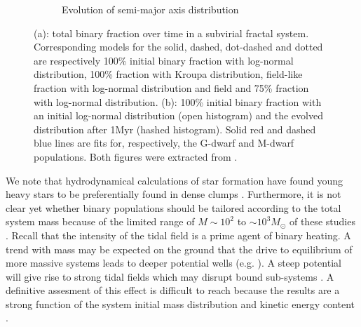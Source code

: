 \begin{figure}
\begin{subfigure}[b]{0.48\textwidth}
        \caption{Evolution of semi-major axis distribution}
        \label{Fig:0_binsim_2}
    \end{subfigure}
\caption{(a): total binary fraction over time in a subvirial fractal system. Corresponding models for the solid, dashed, dot-dashed and dotted are respectively 100\% initial binary fraction with log-normal distribution, 100\% fraction with Kroupa distribution, field-like fraction with log-normal distribution and field and 75\% fraction with log-normal distribution. (b): 100\% initial binary fraction with an initial log-normal distribution (open histogram) and the evolved distribution after 1Myr (hashed histogram). Solid red and dashed blue lines are fits for, respectively, the G-dwarf and M-dwarf populations. Both figures were extracted from \cite{Parker2011}.}
\label{Fig:0_binsimulation}
\end{figure}

 
 
  We note that hydrodynamical calculations of star formation have found young heavy stars to be preferentially found in dense clumps \citep{Maschberger2010}. Furthermore, it is not clear yet whether binary populations should be tailored according to the total system mass because of the limited range of $M \sim 10^2$ to $ \sim 10^3 M_\odot$ of these studies \citep{Kroupa2001,Parker2011,Parker2014}. Recall that the intensity of the tidal field is a prime agent of binary heating.  A trend with mass may be expected on the ground that the drive to equilibrium of more massive systems leads to deeper potential wells (e.g. \citealt{Aarseth1988,Boily2002}). A steep potential will give rise to strong tidal fields which may disrupt bound sub-systems \citep{Boily2004,Renaud2011}. A definitive assesment of this effect is difficult to reach because the results are a strong function of the system initial mass distribution and kinetic energy content \citep{Boily2002,Caputo2014}.